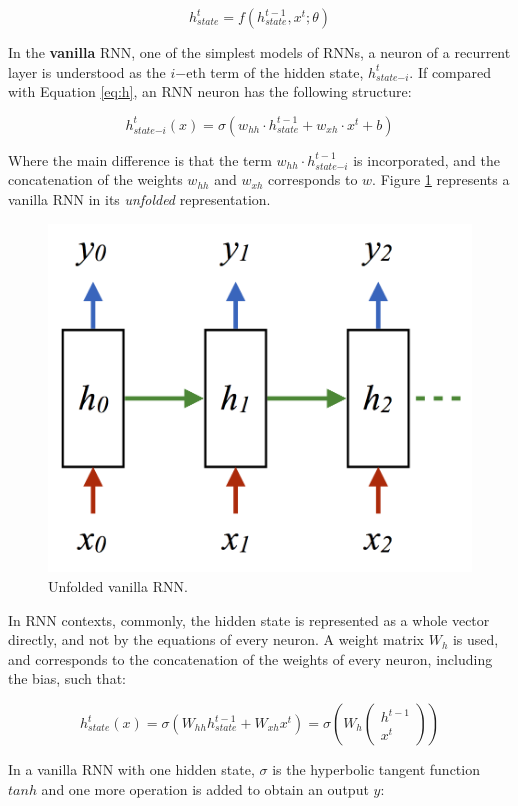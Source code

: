 \begin{equation}
    h_{state}^{t} = f(h_{state}^{t-1}, x^{t}; \theta)
\end{equation}

In the \textbf{vanilla} RNN, one of the simplest models of RNNs, a neuron of a recurrent layer is understood as the $i\mathrm{-eth}$ term of the hidden state, $h_{state\mathrm{-}i}^{t}$. If compared with Equation \ref{eq:h}, an RNN neuron has the following structure:

\begin{equation}
    h_{state\mathrm{-}i}^{t}(x) = \sigma(w_{hh} \cdot h_{state}^{t-1} + w_{xh} \cdot x^{t} + b)
\end{equation}

Where the main difference is that the term $w_{hh} \cdot h_{state\mathrm{-}i}^{t-1}$ is incorporated, and the concatenation of the weights $w_{hh}$ and $w_{xh}$ corresponds to $w$. Figure \ref{fig:rnn_unfolded} represents a vanilla RNN in its \emph{unfolded} representation.

\begin{figure}[h]
    \centering
    \includegraphics[width=0.3\linewidth]{imagenes/cap1/unfolded_rnn.png}
    \caption{Unfolded vanilla RNN.\protect\footnotemark}
    \label{fig:rnn_unfolded}
\end{figure}

In RNN contexts, commonly, the hidden state is represented as a whole vector directly, and not by the equations of every neuron. A weight matrix $W_{h}$ is used, and corresponds to the concatenation of the weights of every neuron, including the bias, such that:

\begin{equation}
    h_{state}^{t}(x) = \sigma(W_{hh} h_{state}^{t-1} + W_{xh} x^{t}) = \sigma \left(W_{h} \begin{pmatrix} h^{t-1} \\ x^{t} \end{pmatrix} \right)
\end{equation}

In a vanilla RNN with one hidden state, $\sigma$ is the hyperbolic tangent function $tanh$ and one more operation is added to obtain an output $y$:

